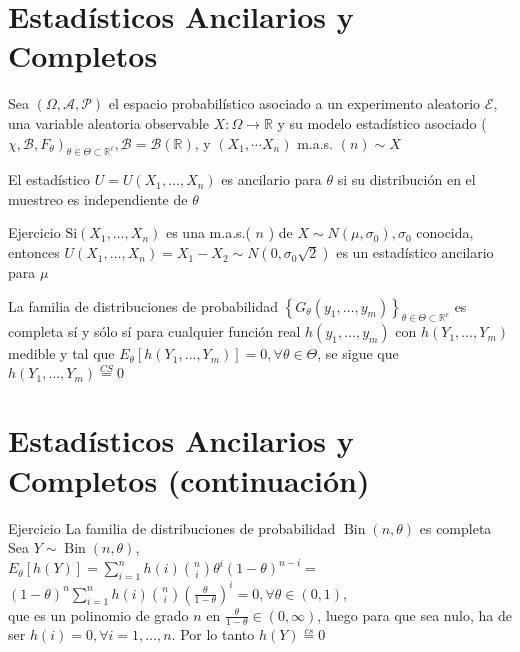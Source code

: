   \section*{Estadísticos Ancilarios y Completos}
  Sea $(\Omega, \mathcal{A}, \mathcal{P})$ el espacio probabilístico asociado a un experimento aleatorio $\mathcal{E}$, una variable aleatoria observable $X: \Omega \longrightarrow \mathbb{R}$ y su modelo estadístico asociado ( $\left.\chi, \mathcal{B}, F_{\theta}\right)_{\theta \in \Theta \subset \mathbb{R}^{\ell}}, \mathcal{B}=\mathcal{B}(\mathbb{R})$, y $\left(X_{1}, \cdots X_{n}\right)$ m.a.s. $(n) \sim X$
  
  El estadístico $U=U\left(X_{1}, \ldots, X_{n}\right)$ es ancilario para $\theta$ si su distribución en el muestreo es independiente de $\theta$
  
  Ejercicio $\mathrm{Si}\left(X_{1}, \ldots, X_{n}\right)$ es una m.a.s.( $n$ ) de $X \sim N\left(\mu, \sigma_{0}\right), \sigma_{0}$ conocida, entonces $U\left(X_{1}, \ldots, X_{n}\right)=X_{1}-X_{2} \sim N\left(0, \sigma_{0} \sqrt{2}\right)$ es un estadístico ancilario para $\mu$
  
  La familia de distribuciones de probabilidad $\left\{G_{\theta}\left(y_{1}, \ldots, y_{m}\right)\right\}_{\theta \in \Theta \subset \mathbb{R}^{e}}$ es completa sí y sólo sí para cualquier función real $h\left(y_{1}, \ldots, y_{m}\right)$ con $h\left(Y_{1}, \ldots, Y_{m}\right)$ medible y tal que $E_{\theta}\left[h\left(Y_{1}, \ldots, Y_{m}\right)\right]=0, \forall \theta \in \Theta$, se sigue que $h\left(Y_{1}, \ldots, Y_{m}\right) \stackrel{C S}{=} 0$
  
  \section*{Estadísticos Ancilarios y Completos (continuación)}
  Ejercicio La familia de distribuciones de probabilidad $\operatorname{Bin}(n, \theta)$ es completa\\
  Sea $Y \sim \operatorname{Bin}(n, \theta)$,\\
  $E_{\theta}[h(Y)]=\sum_{i=1}^{n} h(i)\binom{n}{i} \theta^{i}(1-\theta)^{n-i}=$\\
  $(1-\theta)^{n} \sum_{i=1}^{n} h(i)\binom{n}{i}\left(\frac{\theta}{1-\theta}\right)^{i}=0, \forall \theta \in(0,1)$,\\
  que es un polinomio de grado $n$ en $\frac{\theta}{1-\theta} \in(0, \infty)$, luego para que sea nulo, ha de ser $h(i)=0, \forall i=1, \ldots, n$. Por lo tanto $h(Y) \stackrel{c s}{=} 0$
  
